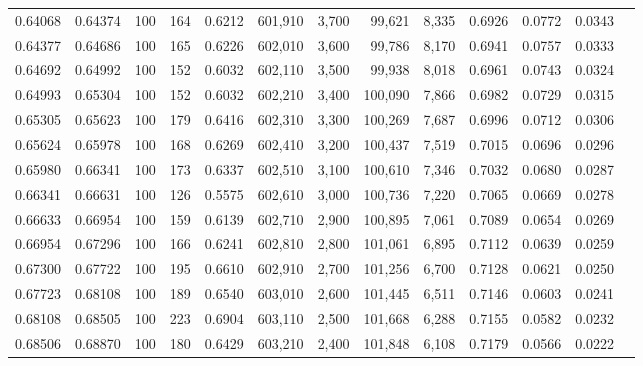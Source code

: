 \begin{tabular}{rrrrrrrrrrrrr}
0.64068 & 0.64374 &   100 & 164 &                                     0.6212 & 601,910 &   3,700 &  99,621 &   8,335 & 0.6926 & 0.0772 & 0.0343 \\
0.64377 & 0.64686 &   100 & 165 &                                     0.6226 & 602,010 &   3,600 &  99,786 &   8,170 & 0.6941 & 0.0757 & 0.0333 \\
0.64692 & 0.64992 &   100 & 152 &                                     0.6032 & 602,110 &   3,500 &  99,938 &   8,018 & 0.6961 & 0.0743 & 0.0324 \\
0.64993 & 0.65304 &   100 & 152 &                                     0.6032 & 602,210 &   3,400 & 100,090 &   7,866 & 0.6982 & 0.0729 & 0.0315 \\
0.65305 & 0.65623 &   100 & 179 &                                     0.6416 & 602,310 &   3,300 & 100,269 &   7,687 & 0.6996 & 0.0712 & 0.0306 \\
0.65624 & 0.65978 &   100 & 168 &                                     0.6269 & 602,410 &   3,200 & 100,437 &   7,519 & 0.7015 & 0.0696 & 0.0296 \\
0.65980 & 0.66341 &   100 & 173 &                                     0.6337 & 602,510 &   3,100 & 100,610 &   7,346 & 0.7032 & 0.0680 & 0.0287 \\
0.66341 & 0.66631 &   100 & 126 &                                     0.5575 & 602,610 &   3,000 & 100,736 &   7,220 & 0.7065 & 0.0669 & 0.0278 \\
0.66633 & 0.66954 &   100 & 159 &                                     0.6139 & 602,710 &   2,900 & 100,895 &   7,061 & 0.7089 & 0.0654 & 0.0269 \\
0.66954 & 0.67296 &   100 & 166 &                                     0.6241 & 602,810 &   2,800 & 101,061 &   6,895 & 0.7112 & 0.0639 & 0.0259 \\
0.67300 & 0.67722 &   100 & 195 &                                     0.6610 & 602,910 &   2,700 & 101,256 &   6,700 & 0.7128 & 0.0621 & 0.0250 \\
0.67723 & 0.68108 &   100 & 189 &                                     0.6540 & 603,010 &   2,600 & 101,445 &   6,511 & 0.7146 & 0.0603 & 0.0241 \\
0.68108 & 0.68505 &   100 & 223 &                                     0.6904 & 603,110 &   2,500 & 101,668 &   6,288 & 0.7155 & 0.0582 & 0.0232 \\
0.68506 & 0.68870 &   100 & 180 &                                     0.6429 & 603,210 &   2,400 & 101,848 &   6,108 & 0.7179 & 0.0566 & 0.0222 \\

\end{tabular}

